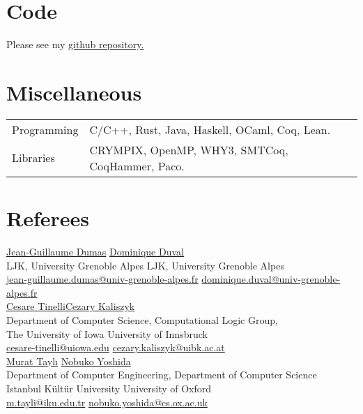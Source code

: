 \documentclass[a4paper,9pt]{article} %
\begin{document}
\section*{Code}

Please see my \href{https://github.com/ekiciburak}{github repository.}

\section*{Miscellaneous}

\begin{tabular}{ll}	
Programming & C/C++, Rust, Java, Haskell, OCaml, Coq, Lean. \\
Libraries & CRYMPIX, OpenMP, WHY3, SMTCoq, CoqHammer, Paco.
\end{tabular}

\section*{Referees}

\href{http://ljk.imag.fr/membres/Jean-Guillaume.Dumas/}{Jean-Guillaume Dumas} \hfill \href{http://ljk.imag.fr/membres/Dominique.Duval/}{Dominique Duval}\\
LJK, University Grenoble Alpes \hfill LJK, University Grenoble Alpes\\
\href{mailto:jean-guillaume.dumas@univ-grenoble-alpes.fr}{jean-guillaume.dumas@univ-grenoble-alpes.fr} \hfill \href{mailto:dominique.duval@univ-grenoble-alpes.fr}{dominique.duval@univ-grenoble-alpes.fr}\\

\href{http://homepage.cs.uiowa.edu/~tinelli/index.html}{Cesare Tinelli}\hfill \href{http://cl-informatik.uibk.ac.at/users/cek/}{Cezary Kaliszyk}\\
Department of Computer Science, \hfill Computational Logic Group,\\
The University of Iowa \hfill University of Innsbruck\\
\href{mailto:cesare-tinelli@uiowa.edu}{cesare-tinelli@uiowa.edu} \hfill \href{mailto:cezary.kaliszyk@uibk.ac.at}{cezary.kaliszyk@uibk.ac.at}\\


\href{https://bm.iku.edu.tr/tr/bilgisayar-muhendisligi-bolumu-akademik-kadro}{Murat Taylı}\hfill
 \href{https://mrg.cs.ox.ac.uk/people/}{Nobuko Yoshida}\\
Department of Computer Engineering,  \hfill Department of Computer Science\\ 
Istanbul Kültür University \hfill University of Oxford \\
\href{mailto: m.tayli@iku.edu.tr}{m.tayli@iku.edu.tr} \hfill 
\href{mailto: m.tayli@iku.edu.tr}{nobuko.yoshida@cs.ox.ac.uk}
\end{document}
